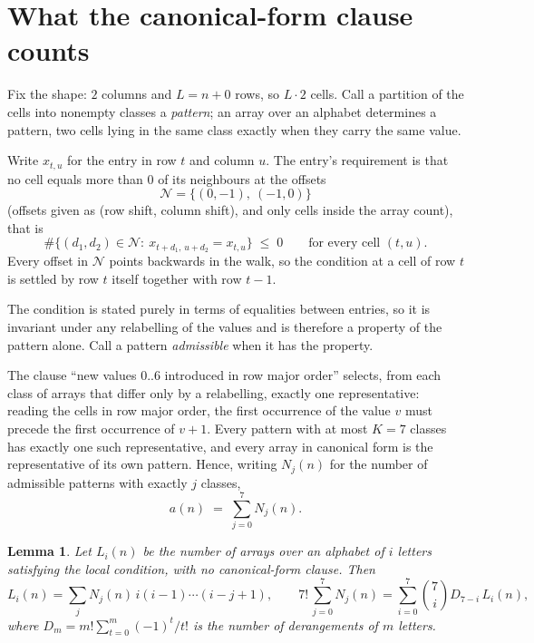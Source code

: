 \documentclass[11pt,a4paper]{article}
\theoremstyle{plain}
\newtheorem{lemma}[theorem]{Lemma}
\theoremstyle{definition}
\begin{document}
\section{What the canonical-form clause counts}

Fix the shape: $2$ columns and $L=n+0$ rows, so $L\cdot2$ cells. Call a
partition of the cells into nonempty classes a \emph{pattern}; an array over an alphabet
determines a pattern, two cells lying in the same class exactly when they carry the same
value.

Write $x_{t,u}$ for the entry in row $t$ and column $u$. The
entry's requirement is that no cell equals more than $0$ of its neighbours at the
offsets
\[
\mathcal N=\{(0,-1),\ (-1,0)\}
\]
(offsets given as (row shift, column shift), and only cells inside the array count),
that is
\begin{equation}\label{eq:loc}
\#\bigl\{(d_1,d_2)\in\mathcal N:\ x_{t+d_1,\,u+d_2}=x_{t,u}\bigr\}\;\le\;0
\qquad\text{for every cell }(t,u).
\end{equation}
Every offset in $\mathcal N$ points backwards in the walk, so the condition at a cell of
row $t$ is settled by row $t$ itself together with row $t-1$.

The condition is stated purely in terms of equalities between entries, so it is invariant
under any relabelling of the values and is therefore a property of the pattern alone. Call a
pattern \emph{admissible} when it has the property.

The clause ``new values $0..6$ introduced in row major order'' selects, from each class
of arrays that differ only by a relabelling, exactly one representative: reading the cells in
row major order, the first occurrence of the value $v$ must precede the first occurrence of
$v+1$. Every pattern with at most $K=7$ classes has exactly one such representative, and
every array in canonical form is the representative of its own pattern. Hence, writing
$N_j(n)$ for the number of admissible patterns with exactly $j$ classes,
\begin{equation}\label{eq:apat}
a(n)\;=\;\sum_{j=0}^{7}N_j(n).
\end{equation}

\begin{lemma}\label{lem:inv}
Let $L_i(n)$ be the number of arrays over an alphabet of $i$ letters satisfying the local
condition, with no canonical-form clause. Then
\[
L_i(n)=\sum_j N_j(n)\,i(i-1)\cdots(i-j+1),
\qquad
7!\,\sum_{j=0}^{7}N_j(n)=\sum_{i=0}^{7}\binom{7}{i}D_{7-i}\,L_i(n),
\]
where $D_m=m!\sum_{t=0}^{m}(-1)^t/t!$ is the number of derangements of $m$ letters.
\end{lemma}
\end{document}

